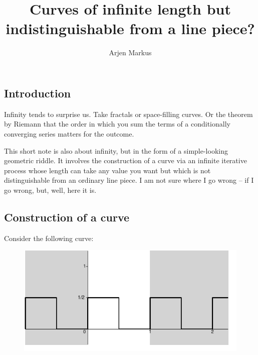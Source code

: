 \documentclass[onecolumn]{article}
\begin{document}
\title{Curves of infinite length but indistinguishable from a line piece?}

\author{Arjen Markus}

\maketitle

\subsection*{Introduction}
Infinity tends to surprise us. Take fractals or space-filling curves. Or
the theorem by Riemann that the order in which you sum the terms of a
conditionally converging series matters for the outcome.

This short note is also about infinity, but in the form of a simple-looking
geometric riddle. It involves the construction of a curve via an infinite
iterative process whose length can take any value you want but which is not
distinguishable from an ordinary line piece. I am not sure where I go wrong --
if I go wrong, but, well, here it is.

\subsection*{Construction of a curve}
Consider the following curve:
\begin{figure}[H]
\begin{center}
\includegraphics{simple-curve1.pdf}
\label{SimpleCurve1}
\end{center}
\end{figure}
\end{document}
